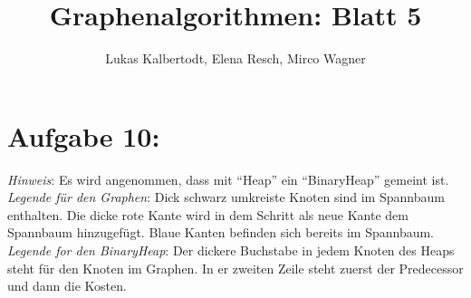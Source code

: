 \documentclass[11pt]{scrartcl} %
\title{Graphenalgorithmen: Blatt 5}
\author{Lukas Kalbertodt, Elena Resch, Mirco Wagner}
\begin{document}
\maketitle


\section*{Aufgabe 10:}
\emph{Hinweis}: Es wird angenommen, dass mit \enquote{Heap} ein \enquote{BinaryHeap} gemeint ist.\\[0.2cm]
\emph{Legende für den Graphen}: Dick schwarz umkreiste Knoten sind im Spannbaum enthalten. Die dicke rote Kante wird in dem Schritt als neue Kante dem Spannbaum hinzugefügt. Blaue Kanten befinden sich bereits im Spannbaum.\\[0.2cm]
\emph{Legende for den BinaryHeap}: Der dickere Buchstabe in jedem Knoten des Heaps steht für den Knoten im Graphen. In er zweiten Zeile steht zuerst der Predecessor und dann die Kosten.
\end{document}

